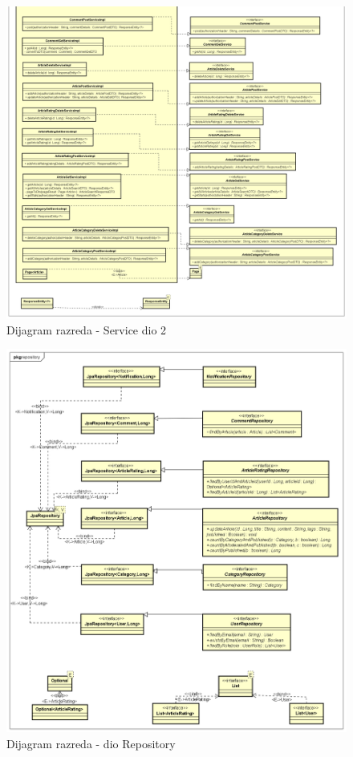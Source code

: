 \begin{figure}[H]
	\includegraphics[scale=0.35]{slike/Class Diagram Service2.png}
	\centering
	\caption{Dijagram razreda - Service dio 2}
	\label{fig:class_diagram_service}
\end{figure}

\eject

\begin{figure}[H]
	\includegraphics[scale=0.4]{slike/Class Diagram Repository.png}
	\centering
	\caption{Dijagram razreda - dio Repository}
	\label{fig:class_diagram_repository}
\end{figure}

